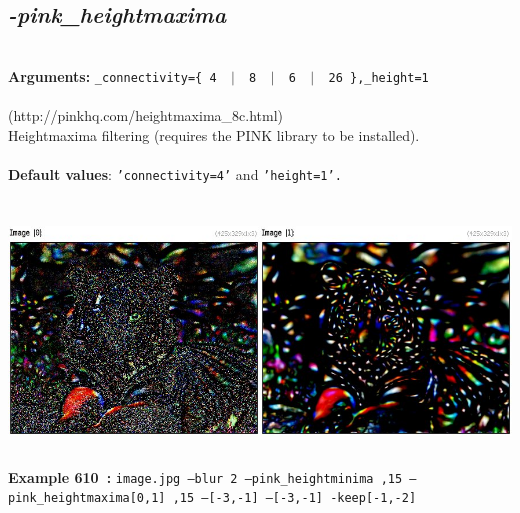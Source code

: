 \documentclass[a4paper,11pt,twoside]{book}
\begin{document}
\subsection{\emph{-pink\_heightmaxima} }\vspace*{-0.5em}
~\\\textbf{Arguments: } 
{\small \texttt{\_connectivity=\{ 4 ~$|$~ 8 ~$|$~ 6 ~$|$~ 26 \},\_height=1}}\\~\\
(http://pinkhq.com/heightmaxima\_8c.html)
~\\Heightmaxima filtering (requires the PINK library to be installed).
~\\~\\\textbf{Default values}: {\small \texttt{'connectivity=4'} and \texttt{'height=1'.}}
\begin{center}\includegraphics[keepaspectratio=true,height=7cm,width=\textwidth]{img/gmic_def610.jpg}\\
{\footnotesize \textbf{Example 610~:} \texttt{image.jpg --blur 2 --pink\_heightminima ,15 --pink\_heightmaxima[0,1] ,15 --[-3,-1] --[-3,-1] -keep[-1,-2]}}
\end{center}
\end{document}
